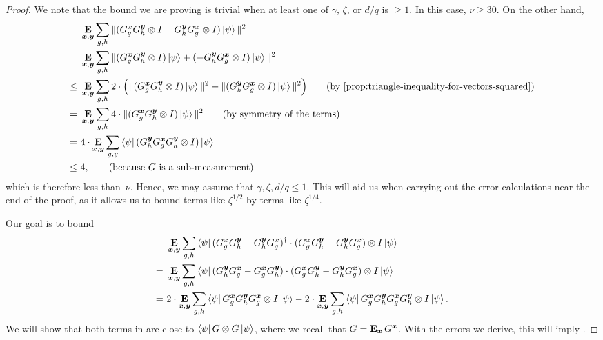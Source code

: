 \begin{proof}
We note that the bound we are proving is trivial when at least one of $\gamma$, $\zeta$, or $d/q$ is $\geq 1$.
In this case, $\nu \geq 30$.
On the other hand,
\begin{align*}
&\E_{\bx,\by} \sum_{g, h} \Vert(G^{\bx}_g G^{\by}_h \ot I - G^{\by}_h G^{\bx}_g \ot I) \ket{\psi}\Vert^2\\
=~&\E_{\bx,\by} \sum_{g, h} \Vert(G^{\bx}_g G^{\by}_h \ot I) \ket{\psi} + (- G^{\by}_h G^{\bx}_g \ot I) \ket{\psi}\Vert^2\\
\leq~&\E_{\bx,\by} \sum_{g, h}
	2\cdot \Big(\Vert(G^{\bx}_g G^{\by}_h \ot I) \ket{\psi} \Vert^2 + \Vert(G^{\by}_h G^{\bx}_g \ot I) \ket{\psi}\Vert^2\Big) \tag{by \Cref{prop:triangle-inequality-for-vectors-squared}}\\
=~&\E_{\bx,\by} \sum_{g, h}
	4\cdot \Vert(G^{\bx}_g G^{\by}_h \ot I) \ket{\psi} \Vert^2 \tag{by symmetry of the terms}\\
=~&4 \cdot \E_{\bx, \by}\sum_{g, y} \bra{\psi} (G^{\by}_h G^{\bx}_g G^{\by}_h \ot I) \ket{\psi}\\
\leq~&4, \tag{because~$G$ is a sub-measurement}
\end{align*}
which is therefore less than~$\nu$.
Hence, we may assume that $\gamma, \zeta, d/q \leq 1$.
This will aid us when carrying out the error calculations near the end of the proof,
as it allows us to bound terms like $\zeta^{1/2}$ by terms like $\zeta^{1/4}$.

Our goal is to bound
\begin{align}
&\mathop{\bf E\/}_{{\boldsymbol{x}}, \boldsymbol{y}} \sum_{g, h} \bra{\psi} (G^{{\boldsymbol{x}}}_{g} G^{\boldsymbol{y}}_h -
    G^{\boldsymbol{y}}_h G^{{\boldsymbol{x}}}_g)^\dagger \cdot(G^{{\boldsymbol{x}}}_{g} G^{\boldsymbol{y}}_h - G^{\boldsymbol{y}}_h
                   G^{{\boldsymbol{x}}}_g) \otimes I \ket{\psi}\nonumber\\
=~&\mathop{\bf E\/}_{{\boldsymbol{x}}, \boldsymbol{y}} \sum_{g, h} \bra{\psi} ( G^{\boldsymbol{y}}_h G^{{\boldsymbol{x}}}_{g}-
    G^{{\boldsymbol{x}}}_g G^{\boldsymbol{y}}_h )\cdot (G^{{\boldsymbol{x}}}_{g} G^{\boldsymbol{y}}_h - G^{\boldsymbol{y}}_h
                   G^{{\boldsymbol{x}}}_g) \otimes I \ket{\psi}\nonumber\\
=~&2\cdot\mathop{\bf E\/}_{{\boldsymbol{x}}, \boldsymbol{y}} \sum_{g,h} \bra{\psi} G^{\boldsymbol{x}}_g G^{\boldsymbol{y}}_h
      G^{{\boldsymbol{x}}}_g \otimes I \ket{\psi}
- 2\cdot \mathop{\bf E\/}_{{\boldsymbol{x}}, \boldsymbol{y}} \sum_{g,h}
      \bra{\psi} G^{{\boldsymbol{x}}}_g G^{\boldsymbol{y}}_h G^{{\boldsymbol{x}}}_g G^{\boldsymbol{y}}_h \otimes I
      \ket{\psi}.\label{eq:gcomterms}
\end{align}
  We will show that both terms in  are close to $\bra{\psi} G \otimes G \ket{\psi}$, where we recall that $G = \mathop{\bf E\/}_{\boldsymbol{x}} G^{\boldsymbol{x}}$.
  With the errors we derive, this will imply .
  

\end{proof}
